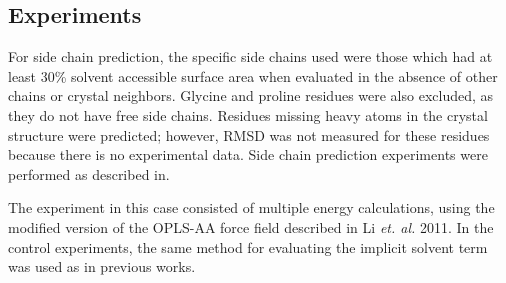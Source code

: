 \subsection*{Experiments}
\label{subsec:experiments}
For side chain prediction, the specific side chains used were those which had at least 30\% solvent accessible surface area when evaluated in the absence of other chains or crystal neighbors.
Glycine and proline residues were also excluded, as they do not have free side chains.
Residues missing heavy atoms in the crystal structure were predicted; however, RMSD was not measured for these residues because there is no experimental data.
Side chain prediction experiments were performed as described in\cite{jacobson2002role}.

The experiment in this case consisted of multiple energy calculations, using the modified version of the OPLS-AA force field described in Li {\it et. al.} 2011\cite{li2011vsgb}.
In the control experiments, the same method for evaluating the implicit solvent term was used as in previous works.

